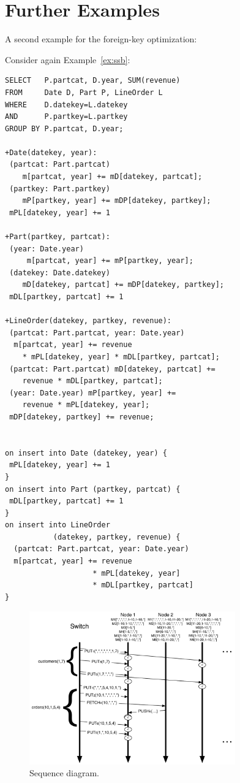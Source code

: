 

\appendix

\section{Further Examples}


A second example for the foreign-key optimization:


\begin{example}
Consider again Example~\ref{ex:ssb}:
\begin{verbatim}
SELECT   P.partcat, D.year, SUM(revenue)
FROM     Date D, Part P, LineOrder L
WHERE    D.datekey=L.datekey
AND      P.partkey=L.partkey
GROUP BY P.partcat, D.year;

+Date(datekey, year):
 (partcat: Part.partcat)
    m[partcat, year] += mD[datekey, partcat];
 (partkey: Part.partkey)
    mP[partkey, year] += mDP[datekey, partkey];
 mPL[datekey, year] += 1

+Part(partkey, partcat):
 (year: Date.year)
     m[partcat, year] += mP[partkey, year];
 (datekey: Date.datekey)
    mD[datekey, partcat] += mDP[datekey, partkey];
 mDL[partkey, partcat] += 1

+LineOrder(datekey, partkey, revenue):
 (partcat: Part.partcat, year: Date.year)
  m[partcat, year] += revenue
    * mPL[datekey, year] * mDL[partkey, partcat];
 (partcat: Part.partcat) mD[datekey, partcat] +=
    revenue * mDL[partkey, partcat];
 (year: Date.year) mP[partkey, year] +=
    revenue * mPL[datekey, year];
 mDP[datekey, partkey] += revenue;


on insert into Date (datekey, year) {
 mPL[datekey, year] += 1
}
on insert into Part (partkey, partcat) {
 mDL[partkey, partcat] += 1
}
on insert into LineOrder
           (datekey, partkey, revenue) {
  (partcat: Part.partcat, year: Date.year)
  m[partcat, year] += revenue
                    * mPL[datekey, year]
                    * mDL[partkey, partcat]
}
\end{verbatim}
\end{example}




\begin{figure}
\begin{center}
\includegraphics[width=3.5in]{images/MessageFlow.pdf}
\caption{Sequence diagram.}
\end{center}
\end{figure}

